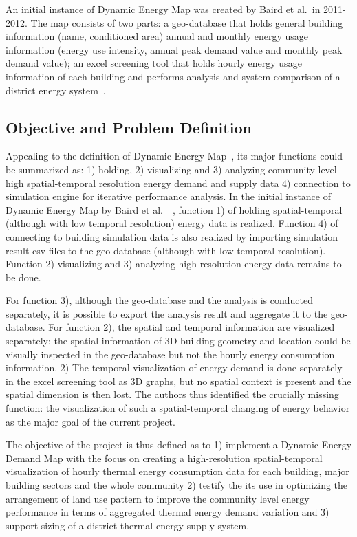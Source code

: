 \documentclass[hidelinks,12pt]{article}
\begin{document}
An initial instance of Dynamic Energy Map was created by Baird et al.\
in 2011-2012. The map consists of two parts: a geo-database that holds
general building information (name, conditioned area) annual and
monthly energy usage information (energy use intensity, annual peak
demand value and monthly peak demand value); an excel screening tool
that holds hourly energy usage information of each building and
performs analysis and system comparison of a district energy
system~\cite{baird2014}.

\subsection{Objective and Problem Definition}
Appealing to the definition of Dynamic Energy Map~\cite{baird2014},
its major functions could be summarized as: 1) holding, 2) visualizing
and 3) analyzing community level high spatial-temporal resolution
energy demand and supply data 4) connection to simulation engine for
iterative performance analysis. In the initial instance of Dynamic
Energy Map by Baird et al.\ ~\cite{baird2014}, function 1) of holding
spatial-temporal (although with low temporal resolution) energy data
is realized. Function 4) of connecting to building simulation data is
also realized by importing simulation result csv files to the
geo-database (although with low temporal resolution). Function 2)
visualizing and 3) analyzing high resolution energy data remains to be
done.

For function 3), although the geo-database and the analysis is
conducted separately, it is possible to export the analysis result and
aggregate it to the geo-database. For function 2), the spatial and
temporal information are visualized separately: the spatial
information of 3D building geometry and location could be visually
inspected in the geo-database but not the hourly energy consumption
information. 2) The temporal visualization of energy demand is done
separately in the excel screening tool as 3D graphs, but no spatial
context is present and the spatial dimension is then lost. The authors
thus identified the crucially missing function: the visualization of
such a spatial-temporal changing of energy behavior as the major goal
of the current project.

The objective of the project is thus defined as to 1) implement a
Dynamic Energy Demand Map with the focus on creating a high-resolution
spatial-temporal visualization of hourly thermal energy consumption
data for each building, major building sectors and the whole community
2) testify the its use in optimizing the arrangement of land use
pattern to improve the community level energy performance in terms of
aggregated thermal energy demand variation and 3) support sizing of a
district thermal energy supply system.
\end{document}
